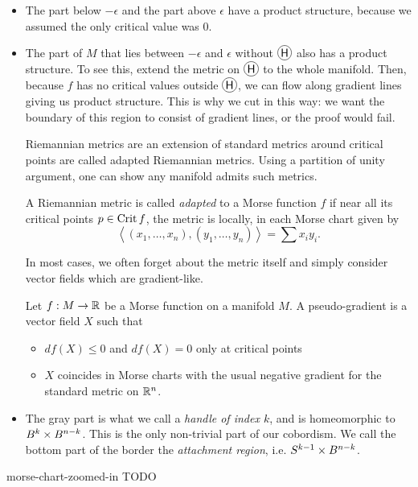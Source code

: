 \begin{itemize}
    \item[\circled{A}] The part below $-\epsilon$ and the part above $\epsilon$ have a product structure, because we assumed the only critical value was $0$.
    \item[\circled{B}] The part of $M$ that lies between $-\epsilon$  and $\epsilon$ without $\circled{H}$ also has a product structure.
        To see this, extend the metric on $\circled{H}$ to the whole manifold. Then, because $f$ has no critical values outside $\circled{H}$, we can flow along gradient lines giving us product structure.
        This is why we cut in this way: we want the boundary of this region to consist of gradient lines, or the proof would fail.

        Riemannian metrics are an extension of standard metrics around critical points are called adapted Riemannian metrics.
        Using a partition of unity argument, one can show any manifold admits such metrics.
        \begin{definition}
            A Riemannian  metric is called \emph{adapted} to a Morse function $f$ if near all its critical points $p \in \operatorname{Crit} f$, the metric is locally, in each Morse chart given by
            \[
            \left<
            (x_1, \ldots, x_n), 
            (y_1, \ldots, y_n)
            \right> = \sum x_i y_i
            .\] 
        \end{definition}
        In most cases, we often forget about the metric itself and simply consider vector fields which are gradient-like.

        \begin{definition}
            Let $f: M \to  \mathbb{R}$ be a Morse function on a manifold $M$. A pseudo-gradient is a vector field $X$ such that
            \begin{itemize}
                \item $df(X) \le 0$ and $df(X) = 0$ only at critical points
                \item $X$ coincides in Morse charts with the usual negative gradient for the standard metric on $\mathbb{R}^{n}$.
            \end{itemize}
        \end{definition}




    \item[\circled{H}]  The gray part is what we call a \emph{handle of index $k$}, and is homeomorphic to $B^{k} \times B^{n-k}$.
        This is the only non-trivial part of our cobordism.
        We call the bottom part of the border the \emph{attachment region}, i.e. $S^{k-1} \times B^{n-k}$.
\end{itemize}
\begin{marginfigure}
    \centering
    \caption{morse-chart-zoomed-in TODO}
    \label{fig:morse-chart-zoomed-in}
\end{marginfigure}






